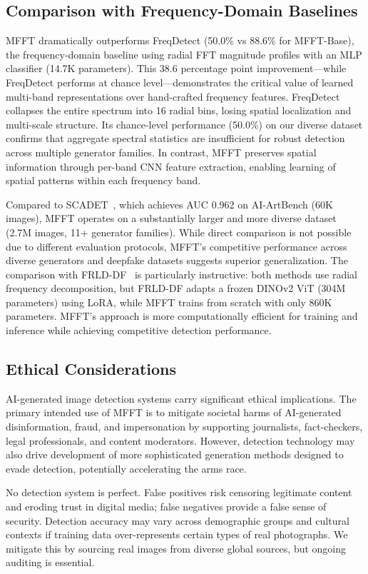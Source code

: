 \documentclass[journal]{IEEEtran}
\begin{document}
\subsection{Comparison with Frequency-Domain Baselines}
MFFT dramatically outperforms FreqDetect (50.0\% vs 88.6\% for MFFT-Base), the frequency-domain baseline using radial FFT magnitude profiles with an MLP classifier (14.7K parameters). This 38.6 percentage point improvement---while FreqDetect performs at chance level---demonstrates the critical value of learned multi-band representations over hand-crafted frequency features. FreqDetect collapses the entire spectrum into 16 radial bins, losing spatial localization and multi-scale structure. Its chance-level performance (50.0\%) on our diverse dataset confirms that aggregate spectral statistics are insufficient for robust detection across multiple generator families. In contrast, MFFT preserves spatial information through per-band CNN feature extraction, enabling learning of spatial patterns within each frequency band.

Compared to SCADET~\cite{zhang2025}, which achieves AUC 0.962 on AI-ArtBench (60K images), MFFT operates on a substantially larger and more diverse dataset (2.7M images, 11+ generator families). While direct comparison is not possible due to different evaluation protocols, MFFT's competitive performance across diverse generators and deepfake datasets suggests superior generalization. The comparison with FRLD-DF~\cite{noureldin2026} is particularly instructive: both methods use radial frequency decomposition, but FRLD-DF adapts a frozen DINOv2 ViT (304M parameters) using LoRA, while MFFT trains from scratch with only 860K parameters. MFFT's approach is more computationally efficient for training and inference while achieving competitive detection performance.

\subsection{Ethical Considerations}
AI-generated image detection systems carry significant ethical implications. The primary intended use of MFFT is to mitigate societal harms of AI-generated disinformation, fraud, and impersonation by supporting journalists, fact-checkers, legal professionals, and content moderators. However, detection technology may also drive development of more sophisticated generation methods designed to evade detection, potentially accelerating the arms race.

No detection system is perfect. False positives risk censoring legitimate content and eroding trust in digital media; false negatives provide a false sense of security. Detection accuracy may vary across demographic groups and cultural contexts if training data over-represents certain types of real photographs. We mitigate this by sourcing real images from diverse global sources, but ongoing auditing is essential.
\end{document}

